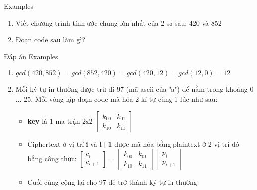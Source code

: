 \begin{frame}{Examples}
\begin{enumerate}
    \item Viết chương trình tính ước chung lớn nhất của 2 số sau: 420 và 852
    \item Đoạn code sau làm gì?
    
\end{enumerate}
\end{frame}

\begin{frame}{Đáp án Examples}
\begin{enumerate}
    \item $gcd(420, 852) = gcd(852, 420) = gcd(420, 12) = gcd(12, 0) = 12$
    \item Mỗi ký tự in thường được trừ đi 97 (mã ascii của "a") để nằm trong khoảng 0 ... 25. Mỗi vòng lặp đoạn code mã hóa 2 kí tự cùng 1 lúc như sau:
    \begin{itemize}
        \item \textbf{key} là 1 ma trận 2x2 $\begin{bmatrix}k_{00} & k_{01} \\ k_{10} & k_{11}\end{bmatrix}$
        \item Ciphertext ở vị trí \textbf{i} và \textbf{i+1} được mã hóa bằng plaintext ở 2 vị trí đó bằng công thức: $\begin{bmatrix}c_i \\ c_{i+1}\end{bmatrix} = \begin{bmatrix}k_{00} & k_{01} \\ k_{10} & k_{11}\end{bmatrix} \begin{bmatrix}p_i \\ p_{i+1}\end{bmatrix}$
        \item Cuối cùng cộng lại cho 97 để trở thành ký tự in thường
    \end{itemize}
\end{enumerate}
\end{frame}